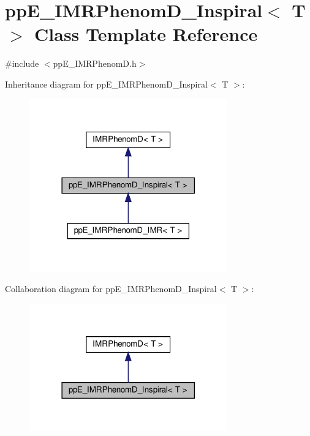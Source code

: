 \hypertarget{classppE__IMRPhenomD__Inspiral}{}\section{pp\+E\+\_\+\+I\+M\+R\+Phenom\+D\+\_\+\+Inspiral$<$ T $>$ Class Template Reference}
\label{classppE__IMRPhenomD__Inspiral}


{\ttfamily \#include $<$pp\+E\+\_\+\+I\+M\+R\+Phenom\+D.\+h$>$}



Inheritance diagram for pp\+E\+\_\+\+I\+M\+R\+Phenom\+D\+\_\+\+Inspiral$<$ T $>$\+:\nopagebreak
\begin{figure}[H]
\begin{center}
\leavevmode
\includegraphics[width=242pt]{classppE__IMRPhenomD__Inspiral__inherit__graph}
\end{center}
\end{figure}


Collaboration diagram for pp\+E\+\_\+\+I\+M\+R\+Phenom\+D\+\_\+\+Inspiral$<$ T $>$\+:\nopagebreak
\begin{figure}[H]
\begin{center}
\leavevmode
\includegraphics[width=242pt]{classppE__IMRPhenomD__Inspiral__coll__graph}
\end{center}
\end{figure}
